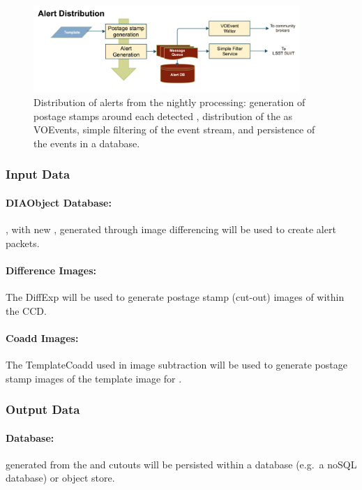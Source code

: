 \begin{figure}[th]
\begin{center}
\includegraphics[width=0.9\textwidth]{figures/Alert_Distribution.png}
\caption{\label{fig:apAlertDistribution} Distribution of alerts from the nightly processing: generation of postage stamps around each detected \DIASource, distribution of the \DIAObjects as VOEvents, simple filtering of the event stream, and persistence of the events in a database.}
\end{center}
\end{figure}

\subsubsection{Input Data}
\label{sec:apADInput}

\paragraph*{DIAObject Database:} \DIAObjects, with new \DIASources, generated through image differencing will be used to create alert packets.

\paragraph*{Difference Images:} The DiffExp will be used to  generate postage stamp (cut-out) images of \DIASources within the CCD.

\paragraph*{Coadd Images:} The TemplateCoadd used in image subtraction will be used to  generate postage stamp images of the template image for \DIAObjects.


\subsubsection{Output Data}

\paragraph*{\VOEvent Database:} \VOEvents generated from the \DIAObjects and cutouts will be persisted within a database (e.g.\ a noSQL database) or object store.




